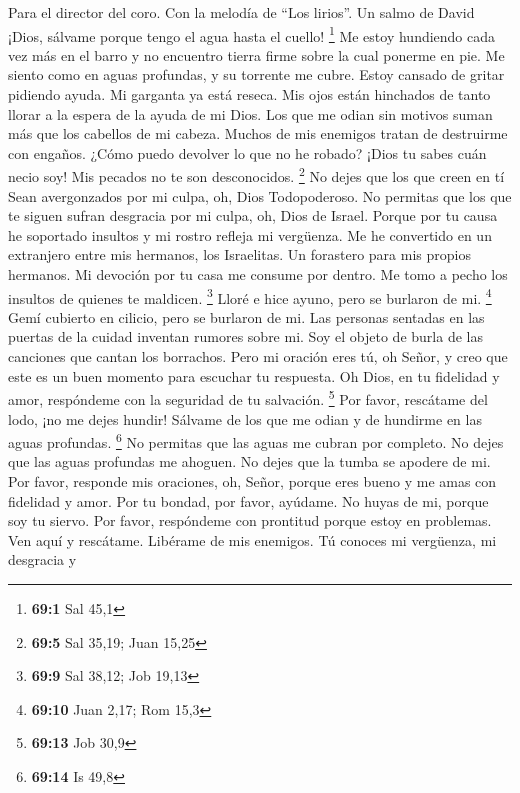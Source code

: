 Para el director del coro. Con la melodía de ``Los lirios''. Un salmo de
David  ¡Dios, sálvame porque tengo el agua hasta el
cuello! \footnote{\textbf{69:1} Sal 45,1}  Me estoy
hundiendo cada vez más en el barro y no encuentro tierra firme sobre la
cual ponerme en pie. Me siento como en aguas profundas, y su torrente me
cubre.  Estoy cansado de gritar pidiendo ayuda. Mi
garganta ya está reseca. Mis ojos están hinchados de tanto llorar a la
espera de la ayuda de mi Dios.  Los que me odian sin
motivos suman más que los cabellos de mi cabeza. Muchos de mis enemigos
tratan de destruirme con engaños. ¿Cómo puedo devolver lo que no he
robado?  ¡Dios tu sabes cuán necio soy! Mis pecados no te
son desconocidos. \footnote{\textbf{69:5} Sal 35,19; Juan 15,25}
 No dejes que los que creen en tí Sean avergonzados por mi
culpa, oh, Dios Todopoderoso. No permitas que los que te siguen sufran
desgracia por mi culpa, oh, Dios de Israel.  Porque por tu
causa he soportado insultos y mi rostro refleja mi vergüenza.
 Me he convertido en un extranjero entre mis hermanos, los
Israelitas. Un forastero para mis propios hermanos.  Mi
devoción por tu casa me consume por dentro. Me tomo a pecho los insultos
de quienes te maldicen. \footnote{\textbf{69:9} Sal 38,12; Job 19,13}
 Lloré e hice ayuno, pero se burlaron de mi. \footnote{\textbf{69:10}
  Juan 2,17; Rom 15,3}  Gemí cubierto en cilicio, pero se
burlaron de mi.  Las personas sentadas en las puertas de
la cuidad inventan rumores sobre mi. Soy el objeto de burla de las
canciones que cantan los borrachos.  Pero mi oración eres
tú, oh Señor, y creo que este es un buen momento para escuchar tu
respuesta. Oh Dios, en tu fidelidad y amor, respóndeme con la seguridad
de tu salvación. \footnote{\textbf{69:13} Job 30,9}  Por
favor, rescátame del lodo, ¡no me dejes hundir! Sálvame de los que me
odian y de hundirme en las aguas profundas. \footnote{\textbf{69:14} Is
  49,8}  No permitas que las aguas me cubran por
completo. No dejes que las aguas profundas me ahoguen. No dejes que la
tumba se apodere de mi.  Por favor, responde mis
oraciones, oh, Señor, porque eres bueno y me amas con fidelidad y amor.
Por tu bondad, por favor, ayúdame.  No huyas de mi,
porque soy tu siervo. Por favor, respóndeme con prontitud porque estoy
en problemas.  Ven aquí y rescátame. Libérame de mis
enemigos.  Tú conoces mi vergüenza, mi desgracia y
